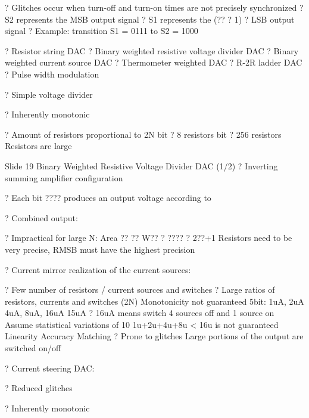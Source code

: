 \documentclass[2pt,landscape]{article}
\begin{document}
\begin{multicols*}{5}
?	Glitches occur when 
turn-off and turn-on 
times are not precisely 
synchronized
?	S2 represents the MSB
output signal
?	S1 represents the
(?? ? 1) ? LSB output signal
?	Example: transition
S1 = 0111 to S2 = 1000



?	Resistor string DAC
?	Binary weighted resistive voltage divider DAC
?	Binary weighted current source DAC
?	Thermometer weighted DAC
?	R-2R ladder DAC
?	Pulse width modulation



?	Simple voltage divider


?	Inherently monotonic


?	Amount of resistors 
proportional to 2N
 bit ? 8 resistors
 bit ? 256 resistors
\textbullet 	Resistors are large


Slide 19	Binary Weighted Resistive Voltage Divider DAC (1/2)
?	Inverting summing amplifier configuration








?	Each bit ???? produces an output voltage according to


?	Combined output:






?	Impractical for large N:
\textbullet 	Area ?? ?? W?? ? ???? ? 2??+1
\textbullet 	Resistors need to be very precise, RMSB must have the highest precision





?	Current mirror realization 
of the current sources:



?	Few number of resistors / current sources and switches
?	Large ratios of resistors, currents and switches (2N)
\textbullet 	Monotonicity not guaranteed
\textbullet 	5bit: 1uA, 2uA 4uA, 8uA, 16uA
\textbullet 	15uA ? 16uA means switch 4 sources off and 1 source on
\textbullet 	Assume statistical variations of 10%
\textbullet 1u+2u+4u+8u < 16u is not guaranteed
\textbullet 	Linearity \textbullet Accuracy \textbullet Matching
?	Prone to glitches
\textbullet 	Large portions of the output are switched on/off



?	Current steering DAC:


?	Reduced glitches


?	Inherently monotonic



\end{multicols*}
\end{document}
